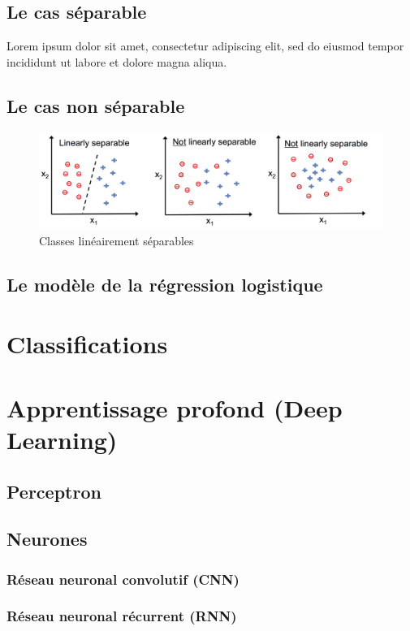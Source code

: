 	\subsection{Le cas séparable }
		Lorem ipsum dolor sit amet, consectetur adipiscing elit, sed do eiusmod tempor incididunt ut labore et dolore magna aliqua.
	\subsection{Le cas non séparable }
	
		\begin{figure}
			\centering
			\includegraphics[width=\textwidth]{images/linearly_separable.png}
			\caption{Classes linéairement séparables \cite[image de][page--48]{ml2008python}
		}
			\label{fig:linearly_separable}
		\end{figure}
		\lipsum[3]
	\subsection{Le modèle de la régression logistique }
		\lipsum[1]
		
	\section{Classifications}
	\lipsum[1]
	
	
	\section{Apprentissage profond (Deep Learning)}
	
	\subsection{Perceptron}
	
	\subsection{Neurones}
	\lipsum[1]
	\subsubsection{Réseau neuronal convolutif (CNN)}
	\lipsum[1]
	\subsubsection{Réseau neuronal récurrent (RNN)}
	\lipsum[1]
	
	
	
	
	

		